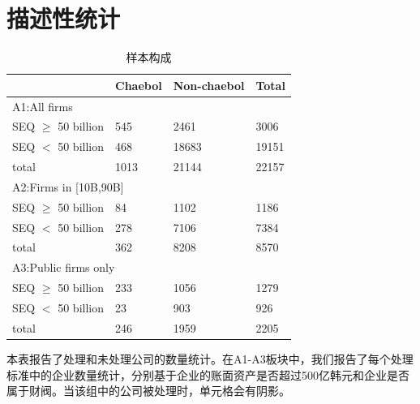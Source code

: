 \documentclass{article}
\begin{document}
\section{描述性统计}

\begin{table}[H]
\caption{样本构成}
\centering
\begin{tabularx}{\textwidth}{lXXX}
\hline
                     & Chaebol                     & Non-chaebol                  & Total \\ \hline
\multicolumn{4}{l}{A1:All firms}                                                          \\ \hline
SEQ $\geq$ 50 billion & \cellcolor[HTML]{CBCEFB}545 & \cellcolor[HTML]{CBCEFB}2461 & 3006  \\
SEQ $<$ 50 billion   & \cellcolor[HTML]{CBCEFB}468 & 18683                        & 19151 \\
total                & 1013                        & 21144                        & 22157 \\ \hline
\multicolumn{4}{l}{A2:Firms in {[}10B,90B{]}}                                             \\ \hline
SEQ $\geq$ 50 billion & \cellcolor[HTML]{CBCEFB}84  & \cellcolor[HTML]{CBCEFB}1102 & 1186  \\
SEQ $<$ 50 billion   & \cellcolor[HTML]{CBCEFB}278 & 7106                         & 7384  \\
total                & 362                         & 8208                         & 8570  \\ \hline
\multicolumn{4}{l}{A3:Public firms only}                                                  \\ \hline
SEQ $\geq$ 50 billion & \cellcolor[HTML]{CBCEFB}233 & \cellcolor[HTML]{CBCEFB}1056 & 1279  \\
SEQ $<$ 50 billion   & \cellcolor[HTML]{CBCEFB}23  & 903                          & 926   \\
total                & 246                         & 1959                         & 2205  \\ \hline
\end{tabularx}
\begin{tablenotes}
\footnotesize
    \item 本表报告了处理和未处理公司的数量统计。在A1-A3板块中，我们报告了每个处理标准中的企业数量统计，分别基于企业的账面资产是否超过500亿韩元和企业是否属于财阀。当该组中的公司被处理时，单元格会有阴影。
\end{tablenotes}
\end{table}
\end{document}
